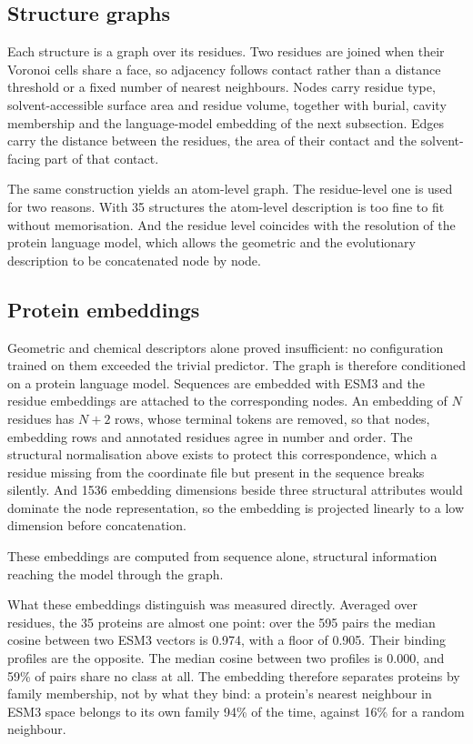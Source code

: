 \subsection{Structure graphs}

Each structure is a graph over its residues. Two residues are joined when their Voronoi cells
share a face, so adjacency follows contact rather than a distance threshold or a fixed number of
nearest neighbours. Nodes carry residue type, solvent-accessible surface area and residue volume,
together with burial, cavity membership and the language-model embedding of the next subsection.
Edges carry the distance between the residues, the area of their contact and the solvent-facing
part of that contact.

The same construction yields an atom-level graph. The residue-level one is used for two reasons.
With 35 structures the atom-level description is too fine to fit without memorisation. And the
residue level coincides with the resolution of the protein language model, which allows the
geometric and the evolutionary description to be concatenated node by node.

\subsection{Protein embeddings}

Geometric and chemical descriptors alone proved insufficient: no configuration trained on them
exceeded the trivial predictor. The graph is therefore conditioned on a protein language model.
Sequences are embedded with ESM3 \cite{esm3} and the residue embeddings are attached to the
corresponding nodes. An embedding of $N$ residues has $N+2$ rows, whose terminal tokens are
removed, so that nodes, embedding rows and annotated residues agree in number and order. The
structural normalisation above exists to protect this correspondence, which a residue missing from
the coordinate file but present in the sequence breaks silently. And 1536 embedding dimensions
beside three structural attributes would dominate the node representation, so the embedding is
projected linearly to a low dimension before concatenation.

These embeddings are computed from sequence alone, structural information reaching the model
through the graph.

What these embeddings distinguish was measured directly. Averaged over residues, the 35 proteins
are almost one point: over the 595 pairs the median cosine between two ESM3 vectors is 0.974, with
a floor of 0.905. Their binding profiles are the opposite. The median cosine between two profiles
is 0.000, and 59\% of pairs share no class at all. The embedding therefore separates proteins by
family membership, not by what they bind: a protein's nearest neighbour in ESM3 space belongs to
its own family 94\% of the time, against 16\% for a random neighbour.

